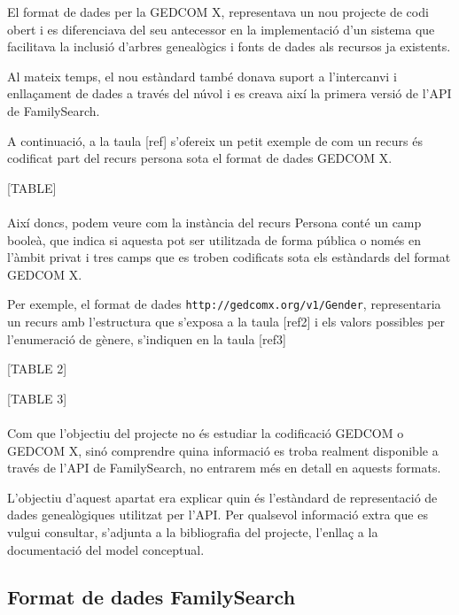          El format de dades per la \gls{GEDCOM X}, representava un nou projecte de codi obert i es diferenciava del seu antecessor en la implementació d'un sistema que facilitava la inclusió d'arbres genealògics i fonts de dades als recursos ja existents.

         Al mateix temps, el nou estàndard també donava suport a l'intercanvi i enllaçament de dades a través del núvol i es creava així la primera versió de l'API de FamilySearch.

         A continuació, a la taula [ref] s'ofereix un petit exemple de com un recurs és codificat part del recurs persona sota el format de dades GEDCOM X.

         [TABLE]

         \paragraph{}
         Així doncs, podem veure com la instància del recurs Persona conté un camp booleà, que indica si aquesta pot ser utilitzada de forma pública o només en l'àmbit privat i tres camps que es troben codificats sota els estàndards del format GEDCOM X.

         Per exemple, el format de dades \verb|http://gedcomx.org/v1/Gender|, representaria un recurs amb l’estructura que s’exposa a la taula [ref2] i els valors possibles per l’enumeració de gènere, s’indiquen en la taula [ref3]

         [TABLE 2]

         [TABLE 3]

         \paragraph{}
         Com que l’objectiu del projecte no és estudiar la codificació GEDCOM o GEDCOM X, sinó comprendre quina informació es troba realment disponible a través de l'API de FamilySearch, no entrarem més en detall en aquests formats.

         L’objectiu d’aquest apartat era explicar quin és l'estàndard de representació de dades genealògiques utilitzat per l'API. Per qualsevol informació extra que es vulgui consultar, s’adjunta a la bibliografia del projecte, l’enllaç a la documentació del model conceptual.


     \subsection{Format de dades FamilySearch}

